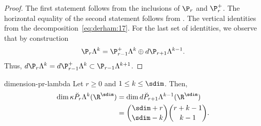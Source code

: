 \begin{proof}
  The first statement follows from the inclusions of $\P_r$ and
  $\P_r^+$. The horizontal equality of the second statement follows
  from . The vertical identities from the
  decomposition~\eqref{eq:derham:17}. For the last set of identities,
  we observe that by construction
  \begin{gather}
    \P_r\Lambda^k = \P_{r-1}^+\Lambda^k \oplus d \P_{r+1}\Lambda^{k-1}.
  \end{gather}
  Thus, $d\P_r\Lambda^k = d\P_{r-1}^+\Lambda^k\subset \P_{r-1}\Lambda^{k+1}$.
\end{proof}

\begin{Theorem}{dimension-pr-lambda}
  Let $r\ge 0$ and $1\le k \le \sdim$. Then,
  \begin{gather}
    \begin{split}
      \dim \kappa \breve P_r\Lambda^k(\R^\sdim)
      & = \dim d \breve P_{r+1}\Lambda^{k-1}(\R^\sdim)
      \\
      &= \binom{\sdim+r}{\sdim-k}\binom{r+k-1}{k-1}.
    \end{split}
  \end{gather}
\end{Theorem}

